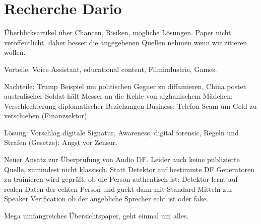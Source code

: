 \section{Recherche Dario}
Überblicksartikel über Chancen, Risiken, mögliche Lösungen.
Paper nicht veröffentlicht, daher besser die angegebenen Quellen nehmen wenn wir zitieren wollen.

Vorteile: Voice Assistant, educational content, Filmindustrie, Games.

Nachteile: Trump Beispiel um politischen Gegner zu diffamieren, China postet australischer Soldat hält Messer an die Kehle von afghanischem Mädchen: Verschlechterung diplomatischer Beziehungen
Business: Telefon Scam um Geld zu verschieben (Finanzsektor)

Lösung: Vorschlag digitale Signatur, Awareness, digital forensic, Regeln und Strafen (Gesetze): Angst vor Zensur. \citep{SAB2020}

Neuer Ansatz zur Überprüfung von Audio DF.
Leider auch keine publizierte Quelle, zumindest nicht klassisch.
Statt Detektor auf bestimmte DF Generatoren zu trainieren wird geprüft, ob die Person authentisch ist:
Detektor lernt auf realen Daten der echten Person und guckt dann mit Standard Mitteln zur Speaker Verification ob der angebliche Sprecher echt ist oder fake. \citep{Pianese2022}

Mega umfangreiches Übersichtspaper, geht einmal um alles.\citep{Masood2022}